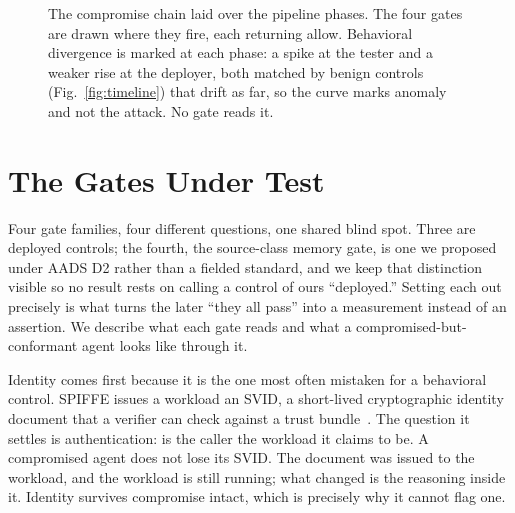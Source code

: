 \documentclass[conference]{IEEEtran}
\begin{document}
\begin{figure}[htbp]
{%
}
\caption{The compromise chain laid over the pipeline phases. The four gates are drawn where they fire, each returning allow. Behavioral divergence is marked at each phase: a spike at the tester and a weaker rise at the deployer, both matched by benign controls (Fig.~\ref{fig:timeline}) that drift as far, so the curve marks anomaly and not the attack. No gate reads it.}
\label{fig:chain-gates}
\end{figure}

\section{The Gates Under Test}\label{sec:gates}

Four gate families, four different questions, one shared blind spot. Three are deployed controls; the fourth, the source-class memory gate, is one we proposed under AADS D2 rather than a fielded standard, and we keep that distinction visible so no result rests on calling a control of ours ``deployed.'' Setting each out precisely is what turns the later ``they all pass'' into a measurement instead of an assertion. We describe what each gate reads and what a compromised-but-conformant agent looks like through it.

Identity comes first because it is the one most often mistaken for a behavioral control. SPIFFE issues a workload an SVID, a short-lived cryptographic identity document that a verifier can check against a trust bundle~\cite{spiffe}. The question it settles is authentication: is the caller the workload it claims to be. A compromised agent does not lose its SVID. The document was issued to the workload, and the workload is still running; what changed is the reasoning inside it. Identity survives compromise intact, which is precisely why it cannot flag one.
\end{document}

